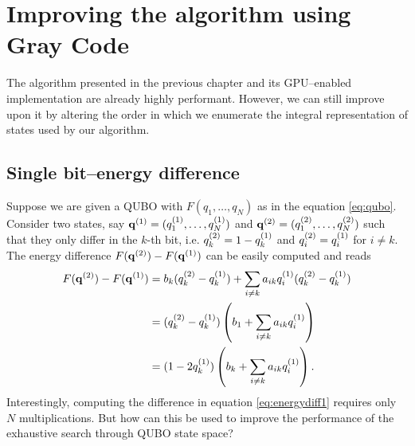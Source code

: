 \section{Improving the algorithm using Gray Code}

The algorithm presented in the previous chapter and its GPU--enabled implementation are already highly performant. However, we can still improve upon it by altering the order in which we enumerate the integral representation of states used by our algorithm.

\subsection{Single bit--energy difference}
Suppose we are given a QUBO with $F(q_{1},\ldots,q_{N})$ as in the equation \ref{eq:qubo}. Consider two states, say $\mathbf{q}^{(1)} = (q^{(1)}_{1},\ldots,q^{(1)}_{N})$ and $\mathbf{q}^{(2)}=(q^{(2)}_{1},\ldots,q^{(2)}_{N})$ such that they only differ in the $k$-th bit, i.e. $q^{(2)}_{k}=1-q^{(1)}_{k}$ and $q^{(2)}_{i}=q^{(1)}_{i}$ for $i \ne k$.
The energy difference $F(\mathbf{q}^{(2)})-F(\mathbf{q}^{(1)})$ can be easily computed and reads
\begin{align}
\begin{split}
  \label{eq:energydiff1}
  F(\mathbf{q}^{(2)})-F(\mathbf{q}^{(1)}) &= b_{k}(q^{(2)}_{k}-q^{(1)}_{k}) + \sum_{i\ne k}a_{ik}q^{(1)}_{i}(q^{(2)}_{k} - q^{(1)}_{k}) \\
                      &= (q^{(2)}_{k}-q^{(1)}_{k}) \left(b_{1} + \sum_{i \ne k}a_{ik}q^{(1)}_{i}\right) \\
  & = (1-2q^{(1)}_{k}) \left(b_{k} + \sum_{i \ne k}a_{ik}q^{(1)}_{i}\right).
\end{split}
\end{align}
Interestingly, computing the difference in equation \eqref{eq:energydiff1} requires only $N$ multiplications.   But how can this be used to improve the performance of the exhaustive search through QUBO state space?

